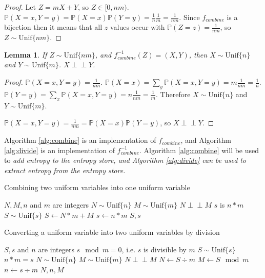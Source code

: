 \documentclass[12pt]{article}
\newtheorem{lemma}{Lemma}
\newcommand{\indep}{\perp\!\!\!\perp}
\newcommand{\unif}[1]{\mathrm{Unif}\{#1\}}
\newcommand{\prob}[1]{\mathbb{P}(#1)}
\begin{document}
\begin{proof}
    Let $Z = mX+Y$, so $Z \in [0,nm)$. $\prob{X=x,Y=y} = \prob{X=x}\mathbb{P}(Y=y) = \frac{1}{n}\frac{1}{m} = \frac{1}{nm}$. Since $f_{combine}$ is a bijection then it means that all $z$ values occur with $\prob{Z=z} = \frac{1}{nm}$, so $Z \sim \unif{nm}$.
    
\end{proof}

\begin{lemma}
    If $Z \sim \unif{nm}$, and $f^{-1}_{combine}(Z) = (X,Y)$, then $X \sim \unif{n}$ and $Y \sim \unif{m}$. $X \indep Y$.
    \label{lem:combine-independent}
\end{lemma}

\begin{proof}
    $\prob{X=x,Y=y} = \frac{1}{nm}$. $\prob{X=x} = \sum_{y}\prob{X=x,Y=y} = m\frac{1}{nm} = \frac{1}{n}$. $\prob{Y=y} = \sum_{x}\prob{X=x,Y=y} = n\frac{1}{nm} = \frac{1}{m}$. Therefore $X\sim \unif{n}$ and $Y\sim \unif{m}$.

    $\mathbb{P}(X=x,Y=y) = \frac{1}{nm} = \mathbb{P}(X=x)\mathbb{P}(Y=y)$, so $X \indep Y$.
\end{proof}

Algorithm \ref{alg:combine} is an implementation of $f_{combine}$, and Algorithm \ref{alg:divide} is an implementation of $f^{-1}_{combine}$. Algorithm \ref{alg:combine} will be used to \em add \em entropy to the entropy store, and Algorithm \ref{alg:divide} can be used to \em extract \em entropy from the entropy store.

\begin{algorithm}
\caption{Combining two uniform variables into one uniform variable}
\label{alg:combine}
\begin{algorithmic}[1]
    \Require $N, M, n$ and $m$ are integers
    \Require $N \sim \unif{n}$
    \Require $M \sim \unif{m}$
    \Require $N \indep M$
    \Ensure $s$ is $n * m$
    \Ensure $S \sim \unif{s}$
  \State $S \gets N * m + M$
  \State $s \gets n * m$
  \State \Return $S, s$
\EndProcedure
\end{algorithmic}
\end{algorithm}

\begin{algorithm}
\caption{Converting a uniform variable into two uniform variables by division}
\label{alg:divide}
\begin{algorithmic}[1]
    \Require $S, s$ and $n$ are integers
    \Require $s \mod m = 0$, i.e. $s$ is divisible by $m$
    \Require $S \sim \unif{s}$
    \Ensure $n * m = s$
    \Ensure $N \sim \unif{n}$
    \Ensure $M \sim \unif{m}$
    \Ensure $N \indep M$
  \State $N \gets S \div m$
  \State $M \gets S \mod m$
  \State $n \gets s \div m$
  \State \Return $N, n, M$
\EndProcedure
\end{algorithmic}
\end{algorithm}
\end{document}
